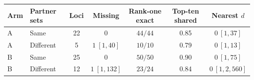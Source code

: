 \begin{tabular}{llccccc}
\toprule
Arm & Partner sets & Loci & Missing & Rank-one exact & Top-ten shared & Nearest $d$ \\
\midrule
A & Same & 22 & 0 & $44/44$ & 0.85 & $0\ [1,37]$ \\
A & Different & 5 & $1\ [1,40]$ & $10/10$ & 0.79 & $0\ [1,13]$ \\
B & Same & 25 & 0 & $50/50$ & 0.90 & $0\ [1,75]$ \\
B & Different & 12 & $1\ [1,132]$ & $23/24$ & 0.84 & $0\ [1,2{,}560]$ \\
\bottomrule
\end{tabular}
